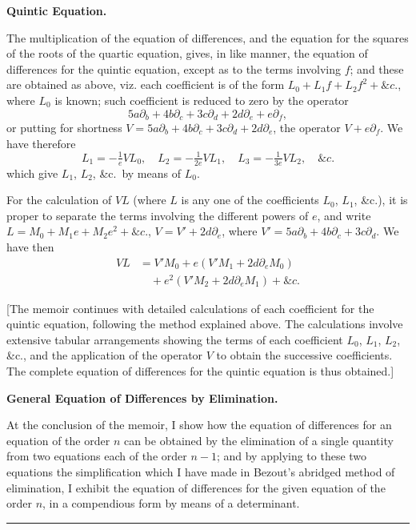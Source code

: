 \documentclass[12pt,a4paper]{article}
\theoremstyle{plain}
\begin{document}
\newpage
\noindent\textbf{Quintic Equation.}

The  multiplication  of  the  equation  of  differences,  and  the  equation  for  the  squares
of  the  roots  of  the  quartic  equation,  gives,  in  like  manner,  the  equation  of  differences
for  the  quintic  equation,  except  as  to  the  terms  involving  $f$;  and  these  are  obtained
as  above,  viz.  each  coefficient  is  of  the  form  $L_0 + L_1 f + L_2 f^2 + \&c.$,  where  $L_0$  is  known;
such  coefficient  is  reduced  to  zero  by  the  operator
\[
5a\partial_b + 4b\partial_c + 3c\partial_d + 2d\partial_e + e\partial_f,
\]
or  putting  for  shortness  $V = 5a\partial_b + 4b\partial_c + 3c\partial_d + 2d\partial_e$,  the  operator  $V + e\partial_f$.  We  have
therefore
\[
L_1 = -\tfrac{1}{e} VL_0, \quad L_2 = -\tfrac{1}{2e} VL_1, \quad L_3 = -\tfrac{1}{3e} VL_2, \quad \&c.
\]
which  give  $L_1$,  $L_2$,  \&c.\  by  means  of  $L_0$.

For  the  calculation  of  $VL$  (where  $L$  is  any  one  of  the  coefficients  $L_0$,  $L_1$,  \&c.),
it  is  proper  to  separate  the  terms  involving  the  different  powers  of  $e$,  and  write
$L = M_0 + M_1 e + M_2 e^2 + \&c.$,  $V = V' + 2d\partial_e$,  where  $V' = 5a\partial_b + 4b\partial_c + 3c\partial_d$.  We  have  then
\begin{align*}
VL &= V'M_0 + e(V'M_1 + 2d\partial_e M_0) \\
   &\quad + e^2(V'M_2 + 2d\partial_e M_1) + \&c.
\end{align*}

\medskip

[The  memoir  continues  with  detailed  calculations  of  each  coefficient  for  the  quintic
equation,  following  the  method  explained  above.  The  calculations  involve  extensive
tabular  arrangements  showing  the  terms  of  each  coefficient  $L_0$,  $L_1$,  $L_2$,  \&c.,  and
the  application  of  the  operator  $V$  to  obtain  the  successive  coefficients.  The  complete
equation  of  differences  for  the  quintic  equation  is  thus  obtained.]

\medskip

\noindent\textbf{General  Equation  of  Differences  by  Elimination.}

At  the  conclusion  of  the  memoir,  I  show  how  the  equation  of  differences  for  an
equation  of  the  order  $n$  can  be  obtained  by  the  elimination  of  a  single  quantity  from
two  equations  each  of  the  order  $n-1$;  and  by  applying  to  these  two  equations  the
simplification  which  I  have  made  in  Bezout's  abridged  method  of  elimination,  I  exhibit
the  equation  of  differences  for  the  given  equation  of  the  order  $n$,  in  a  compendious
form  by  means  of  a  determinant.

\vspace{2em}

\noindent\rule{\textwidth}{0.4pt}

\medskip

\end{document}
